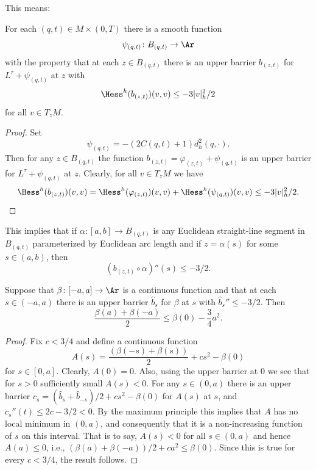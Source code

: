 This means:

\begin{claim}
\label{claim:strictly-concave-barrier}
For each $(q,t)\in M\times(0,T)$ there is a smooth function
$$\psi_{(q,t)}\colon B_{(q,t)}\to \Ar$$
 with the property that at each
$z\in B_{(q,t)}$ there is an upper barrier $b_{(z,t)}$ for
$L^\tau+\psi_{(q,t)}$ at $z$ with
$$\Hess^h(b_{(z,t)})(v,v)\le -3|v|_h^2/2$$
for all $v\in T_zM$.
\end{claim}

\begin{proof}
 Set
$$\psi_{(q,t)}=-(2C(q,t)+1)d^2_h(q,\cdot).$$
Then  for any $z\in B_{(q,t)}$ the function
$b_{(z,t)}=\varphi_{(z,t)}+\psi_{(q,t)}$ is an upper barrier  for
$L^\tau+\psi_{(q,t)}$ at $z$. Clearly, for all $v\in T_zM$ we have
$$\Hess^h(b_{(z,t)})(v,v)=\Hess^h(\varphi_{(z,t)})(v,v)+\Hess^h(\psi_{(q,t)})(v,v)\le -3|v|_h^2/2.$$
\end{proof}

This implies that if $\alpha\colon [a,b]\to B_{(q,t)}$ is any
Euclidean straight-line segment in $B_{(q,t)}$ parameterized by
Euclidean arc length and if $z= \alpha(s)$ for some $s\in (a,b)$,
then
$$(b_{(z,t)}\circ\alpha)''(s)\le -3/2.$$


\begin{claim}
\label{claim:one-dim-barrier-maximum-principle}
Suppose that $\beta\colon [-a,a]\to \Ar$ is a continuous function
and that at each $s\in (-a,a)$ there is an upper barrier $\hat b_s$
for $\beta$  at $s$ with $\hat b_s''\le -3/2$. Then
$$\frac{\beta(a)+\beta(-a)}{2}\le \beta(0)-\frac{3}{4}a^2.$$
\end{claim}

\begin{proof}
Fix $c<3/4$ and define a continuous function
$$A(s)=\frac{(\beta(-s)+\beta(s))}{2}+cs^2-\beta(0)$$ for $s\in [0,a]$.
Clearly, $A(0)=0$. Also, using the upper barrier at $0$ we see that
for $s>0$ sufficiently small $A(s)<0$. For any $s\in (0,a)$ there is
an upper barrier $c_s=(\hat b_{s}+\hat b_{-s})/2+cs^2-\beta(0)$ for
$A(s)$ at $s$, and $c_s''(t)\le 2c-3/2<0$. By the maximum principle
this implies that $A$ has no local minimum in $(0,a)$, and
consequently that it is a non-increasing function of $s$ on this
interval. That is to say, $A(s)<0$ for all $s\in (0,a)$ and hence
$A(a)\le 0$, i.e., $(\beta(a)+\beta(-a))/2+ca^2\le \beta(0)$. Since
this is true for every $c<3/4$, the result follows.
\end{proof}

